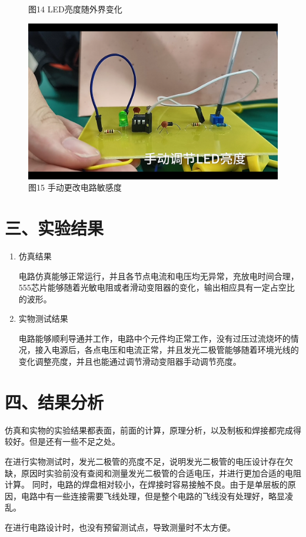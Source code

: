\documentclass[a4paper,12pt]{article}
\begin{document}
\begin{enumerate}
\begin{figure}
\begin{minipage}{0.4\textwidth}
					\caption*{图14 LED亮度随外界变化}
				\end{minipage}
				\qquad
				\begin{minipage}{0.4\textwidth}
					\centering
					\includegraphics[width=\textwidth]{10.png}
					\caption*{图15 手动更改电路敏感度}
				\end{minipage}
			\end{figure}
	\end{enumerate}
	\section*{三、实验结果}
	\begin{enumerate}
		\item 仿真结果 \par 
		\qquad 电路仿真能够正常运行，并且各节点电流和电压均无异常，充放电时间合理，555芯片能够随着光敏电阻或者滑动变阻器的变化，输出相应具有一定占空比的波形。
		\item 实物测试结果 \par 
		\qquad 电路能够顺利导通并工作，电路中个元件均正常工作，没有过压过流烧坏的情况，接入电源后，各点电压和电流正常，并且发光二极管能够随着环境光线的变化调整亮度，并且也能通过调节滑动变阻器手动调节亮度。
	\end{enumerate}
	\section*{四、结果分析}
	仿真和实物的实验结果都表面，前面的计算，原理分析，以及制板和焊接都完成得较好。但是还有一些不足之处。\par 
	在进行实物测试时，发光二极管的亮度不足，说明发光二极管的电压设计存在欠缺，原因时实验前没有查阅和测量发光二极管的合适电压，并进行更加合适的电阻计算。
	同时，电路的焊盘相对较小，在焊接时容易接触不良。由于是单层板的原因，电路中有一些连接需要飞线处理，但是整个电路的飞线没有处理好，略显凌乱。\par 
	在进行电路设计时，也没有预留测试点，导致测量时不太方便。\par 
\end{document}
